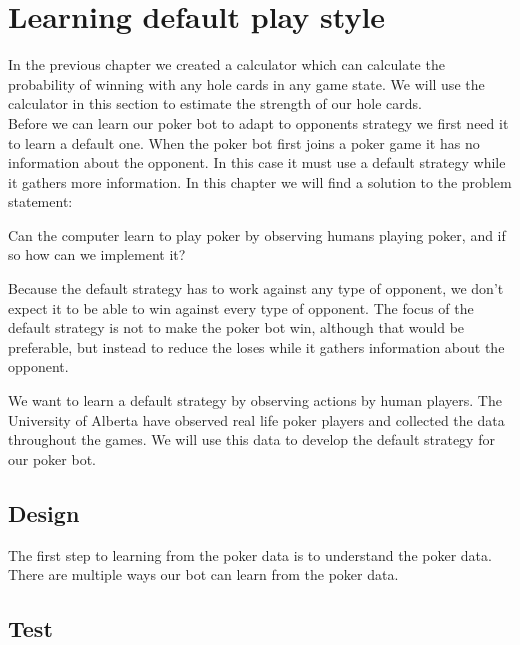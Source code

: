 \section{Learning default play style}
\label{sec:part2}
In the previous chapter we created a calculator which can calculate the probability of winning with any hole cards in any game state. We will use the calculator in this section to estimate the strength of our hole cards.\\

Before we can learn our poker bot to adapt to opponents strategy we first need it to learn a default one. When the poker bot first joins a poker game it has no information about the opponent. In this case it must use a default strategy while it gathers more information.
In this chapter we will find a solution to the problem statement:

\vspace{4mm}
\begin{statementBox}
Can the computer learn to play poker by observing humans playing poker, and if so how can we implement it?
\end{statementBox}
\vspace{4mm}

Because the default strategy has to work against any type of opponent, we don't expect it to be able to win against every type of opponent. The focus of the default strategy is not to make the poker bot win, although that would be preferable, but instead to reduce the loses while it gathers information about the opponent.

We want to learn a default strategy by observing actions by human players. The University of Alberta have observed real life poker players and collected the data throughout the games. We will use this data to develop the default strategy for our poker bot.

\subsection{Design}
The first step to learning from the poker data is to understand the poker data. 
There are multiple ways our bot can learn from the poker data. 

\subsection{Test}
